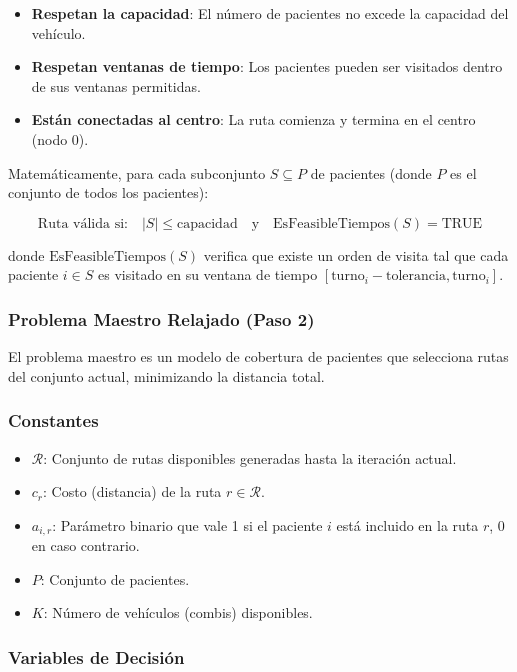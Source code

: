 \documentclass[12pt]{article}
\begin{document}
\begin{itemize}
    \item \textbf{Respetan la capacidad}: El número de pacientes no excede la capacidad del vehículo.
    \item \textbf{Respetan ventanas de tiempo}: Los pacientes pueden ser visitados dentro de sus ventanas permitidas.
    \item \textbf{Están conectadas al centro}: La ruta comienza y termina en el centro (nodo 0).
\end{itemize}

Matemáticamente, para cada subconjunto $S \subseteq P$ de pacientes (donde $P$ es el conjunto de todos los pacientes):

\[
\text{Ruta válida si:} \quad |S| \leq \text{capacidad} \quad \text{y} \quad \text{EsFeasibleTiempos}(S) = \text{TRUE}
\]

donde $\text{EsFeasibleTiempos}(S)$ verifica que existe un orden de visita tal que cada paciente $i \in S$ es visitado en su ventana de tiempo $[\text{turno}_i - \text{tolerancia}, \text{turno}_i]$.

\subsubsection{Problema Maestro Relajado (Paso 2)}

El problema maestro es un modelo de cobertura de pacientes que selecciona rutas del conjunto actual, minimizando la distancia total.

\subsubsection*{Constantes}

\begin{itemize}
    \item $\mathcal{R}$: Conjunto de rutas disponibles generadas hasta la iteración actual.
    \item $c_r$: Costo (distancia) de la ruta $r \in \mathcal{R}$.
    \item $a_{i,r}$: Parámetro binario que vale 1 si el paciente $i$ está incluido en la ruta $r$, 0 en caso contrario.
    \item $P$: Conjunto de pacientes.
    \item $K$: Número de vehículos (combis) disponibles.
\end{itemize}

\subsubsection*{Variables de Decisión}
\end{document}
